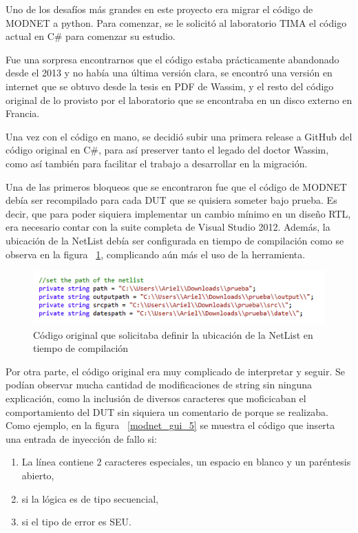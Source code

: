 Uno de los desafíos más grandes en este proyecto era migrar el código de MODNET a python. Para comenzar, se le solicitó al laboratorio TIMA el código actual en C\# para comenzar su estudio.

Fue una sorpresa encontrarnos que el código estaba prácticamente abandonado desde el 2013 y no había una última versión clara, se encontró una versión en internet que se obtuvo desde la tesis en PDF de Wassim, y el resto del código original de lo provisto por el laboratorio que se encontraba en un disco externo en Francia.

Una vez con el código en mano, se decidió subir una primera release a GitHub del código original en C\#, para así preserver tanto el legado del doctor Wassim, como así también para facilitar el trabajo a desarrollar en la migración.

Una de las primeros bloqueos que se encontraron fue que el código de MODNET debía ser recompilado para cada DUT que se quisiera someter bajo prueba. Es decir, que para poder siquiera implementar un cambio mínimo en un diseño RTL, era necesario contar con la suite completa de Visual Studio 2012. Además, la ubicación de la NetList debía ser configurada en tiempo de compilación como se observa en la figura ~\ref{modnet_gui_1}, complicando aún más el uso de la herramienta.

\begin{figure}[H]
	\centering
	\includegraphics[width=1 \textwidth, frame]{img/modnet_gui_1.png}
	\caption{ Código original que solicitaba definir la ubicación de la NetList en tiempo de compilación}
	\label{modnet_gui_1}
\end{figure}

Por otra parte, el código original era muy complicado de interpretar y seguir. Se podían observar mucha cantidad de modificaciones de string sin ninguna explicación, como la inclusión de diversos caracteres que moficicaban el comportamiento del DUT sin siquiera un comentario de porque se realizaba. Como ejemplo, en la figura ~\ref{modnet_gui_5} se muestra el código que inserta una entrada de inyección de fallo si: 

\begin{enumerate}
    \item La línea contiene 2 caracteres especiales, un espacio en blanco y un paréntesis abierto,
    \item si la lógica es de tipo secuencial,
    \item si el tipo de error es SEU.
\end{enumerate}

